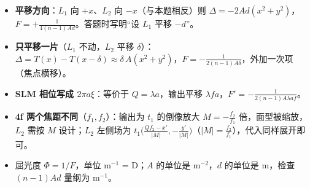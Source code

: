 \begin{warn}[变式与易错]
\begin{itemize}
\item \textbf{平移方向}：$L_1$ 向 $+x$、$L_2$ 向 $-x$（与本题相反）则 $\Delta=-2Ad(x^2+y^2)$，$F=+\frac{1}{4(n-1)Ad}$。答题时写明“设 $L_1$ 平移 $-d$”。
\item \textbf{只平移一片}（$L_1$ 不动，$L_2$ 平移 $\delta$）：$\Delta=T(x)-T(x-\delta)\approx\delta\,A(x^2+y^2)$，$F=-\frac{1}{2(n-1)A\delta}$，外加一次项（焦点横移）。
\item \textbf{SLM 相位写成 $2\pi a\xi$}：等价于 $Q=\lambda a$，输出平移 $\lambda fa$，$F'=-\frac{1}{2(n-1)A\lambda af}$。
\item \textbf{4f 两个焦距不同}（$f_1,f_2$）：输出为 $t_1$ 的倒像放大 $M=-\frac{f_2}{f_1}$ 倍，面型被缩放，$L_2$ 需按 $M$ 设计；$L_2$ 左侧场为 $t_1\big(\frac{Qf_2-x'}{|M|},-\frac{y'}{|M|}\big)$（$|M|=\frac{f_2}{f_1}$），代入同样展开即可。
\item 屈光度 $\Phi=1/F$，单位 m$^{-1}$ = D；$A$ 的单位是 m$^{-2}$，$d$ 的单位是 m，检查 $(n-1)Ad$ 量纲为 m$^{-1}$。
\end{itemize}
\end{warn}


